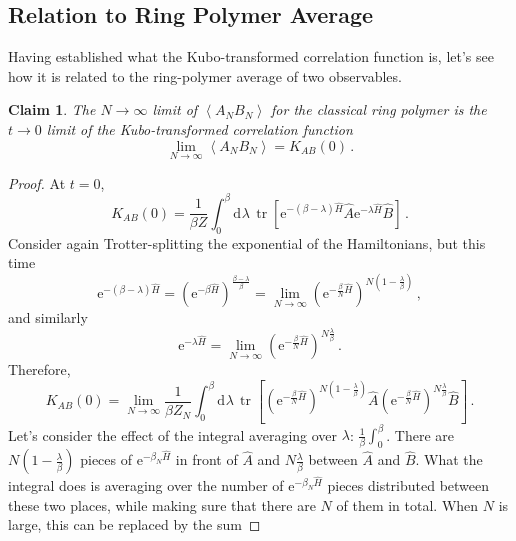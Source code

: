 \documentclass{article}
\theoremstyle{plain}\theoremheaderfont{\normalfont\itshape}\theorembodyfont{\rmfamily}\theoremseparator{.}\newtheorem*{rem}{Remark}\newtheorem*{ex}{Example}\newtheorem*{proof}{Proof}\newtheorem*{altp}{Alternative proof}
\theoremstyle{plain}\theoremheaderfont{\normalfont\bfseries}\theorembodyfont{\rmfamily}\theoremseparator{.}\newtheorem{thm}{Theorem}[section]\newtheorem{lem}[thm]{Lemma}\newtheorem{prop}[thm]{Proposition}\newtheorem*{cor}{Corollary}\newtheorem{defn}[thm]{Definition}\newtheorem{clm}[thm]{Claim}\newtheorem{clminproof}{Claim}
\theoremstyle{break}\theoremheaderfont{\normalfont\itshape}\theorembodyfont{\rmfamily}\theoremseparator{.\medskip}\newtheorem*{proofskip}{Proof}\newtheorem*{exs}{Examples}\newtheorem*{rems}{Remarks}
\theoremstyle{break}\theoremheaderfont{\normalfont\bfseries}\theorembodyfont{\rmfamily}\theoremseparator{.\medskip}\newtheorem{lemskip}[thm]{Lemma}\newtheorem{defnskip}[thm]{Definition}\newtheorem{propskip}[thm]{Proposition}\newtheorem{thmskip}[thm]{Theorem}
\numberwithin{equation}{section}
\newcommand{\ee}{\mathrm{e}}
\newcommand{\dd}[2][]{\mathrm{d}^{#1} #2\,}
\newcommand{\eval}[1]{\left\langle #1 \right\rangle}
\DeclareMathOperator{\tr}{tr}
\begin{document}
    \subsection{Relation to Ring Polymer Average}

    Having established what the Kubo-transformed correlation function is, let's see how it is related to the ring-polymer average of two observables.
    \begin{clm}
        The \(N\to\infty\) limit of \(\eval{A_N B_N}\) for the classical ring polymer is the \(t\to 0\) limit of the Kubo-transformed correlation function
        \begin{equation}
            \lim_{N\to\infty}\eval{A_N B_N}=K_{AB}(0)\,.
        \end{equation}
    \end{clm}
    \begin{proof}
        At \(t=0\),
        \begin{equation}
            K_{AB}(0)=\frac{1}{\beta Z}\int_{0}^{\beta}\dd{\lambda}\tr[\ee^{-(\beta-\lambda)\hat{H}}\hat{A}\ee^{-\lambda\hat{H}}\hat{B}]\,.
        \end{equation}
        Consider again Trotter-splitting the exponential of the Hamiltonians, but this time
        \begin{equation}
            \ee^{-(\beta-\lambda)\hat{H}}=\left(\ee^{-\beta\hat{H}}\right)^{\frac{\beta-\lambda}{\beta}}=\lim_{N\to\infty}\left(\ee^{-\frac{\beta}{N}\hat{H}}\right)^{N(1-\frac{\lambda}{\beta})}\,,
        \end{equation}
        and similarly
        \begin{equation}
            \ee^{-\lambda\hat{H}}=\lim_{N\to\infty}\left(\ee^{-\frac{\beta}{N}\hat{H}}\right)^{N\frac{\lambda}{\beta}}\,.
        \end{equation}
        Therefore,
        \begin{equation}
            K_{AB}(0)=\lim_{N\to\infty}\frac{1}{\beta Z_N}\int_{0}^{\beta}\dd{\lambda}\tr\left[\left(\ee^{-\frac{\beta}{N}\hat{H}}\right)^{N(1-\frac{\lambda}{\beta})}\hat{A}\left(\ee^{-\frac{\beta}{N}\hat{H}}\right)^{N\frac{\lambda}{\beta}}\hat{B}\right]\,.
        \end{equation}
        Let's consider the effect of the integral averaging over \(\lambda\): \(\frac{1}{\beta}\int_{0}^{\beta}\). There are \(N(1-\frac{\lambda}{\beta})\) pieces of \(\ee^{-\beta_N \hat{H}}\) in front of \(\hat{A}\) and \(N\frac{\lambda}{\beta}\) between \(\hat{A}\) and \(\hat{B}\). What the integral does is averaging over the number of \(\ee^{-\beta_N \hat{H}}\) pieces distributed between these two places, while making sure that there are \(N\) of them in total. When \(N\) is large, this can be replaced by the sum

\end{proof}
\end{document}
